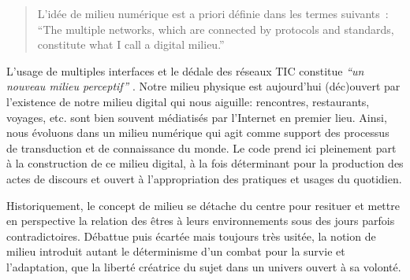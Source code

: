 \begin{quote}
L’idée de milieu numérique est a priori définie dans les termes suivants : 
“The multiple networks, which are connected by protocols and standards, constitute what I call a digital milieu.” \citep{Hui2012}
\end{quote}

L’usage de multiples interfaces et le dédale des réseaux TIC constitue \textit{“un nouveau milieu perceptif”} \citep{Barboza2006}. Notre milieu physique est aujourd’hui (déc)ouvert par l’existence de notre milieu digital qui nous aiguille: rencontres, restaurants, voyages, etc. sont bien souvent médiatisés par l’Internet en premier lieu. Ainsi, nous évoluons dans un milieu numérique qui agit comme support des processus de transduction et de connaissance du monde. Le code prend ici pleinement part à la construction de ce milieu digital, à la fois déterminant pour la production des actes de discours et ouvert à l’appropriation des pratiques et usages du quotidien.

Historiquement, le concept de milieu se détache du centre pour resituer et mettre en perspective la relation des êtres à leurs environnements sous des jours parfois contradictoires. Débattue puis écartée mais toujours très usitée, la notion de milieu introduit autant le déterminisme d’un combat pour la survie et l’adaptation, que la liberté créatrice du sujet dans un univers ouvert à sa volonté. 

